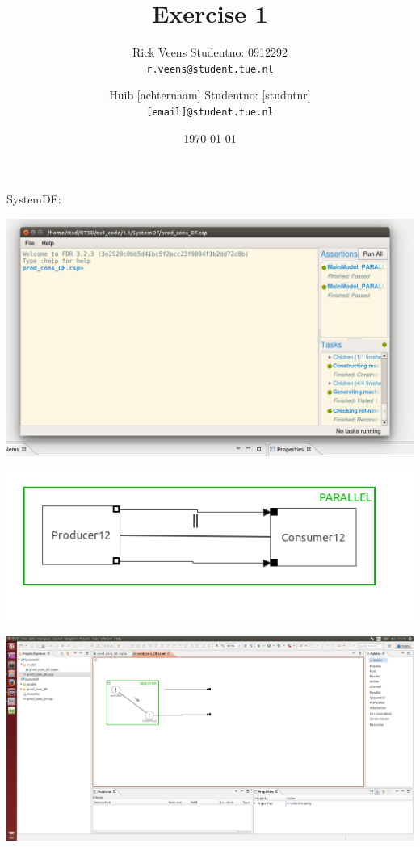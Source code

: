 \documentclass[a4paper,twoside,11pt]{article}
\title{\vspace{-\baselineskip}\sffamily\bfseries Exercise 1}
\author{
	Rick Veens \qquad Studentno: 0912292\\
	\texttt{r.veens@student.tue.nl}
	\and
	Huib [achternaam] \qquad Studentno: [studntnr]\\
	\texttt{[email]@student.tue.nl}
}
\date{\today}
\begin{document}
\maketitle

\section{}
\subsection{}
\subsubsection{}
SystemDF:\\
	\centerline{\includegraphics[width=\linewidth]{./images/1_1-SystemDF.png}}
	\centerline{\includegraphics[width=\linewidth]{./images/1_1-SystemDF_main.png}}
	\centerline{\includegraphics[width=\linewidth]{./images/1_1-SystemDF_cons.png}}
\end{document}
